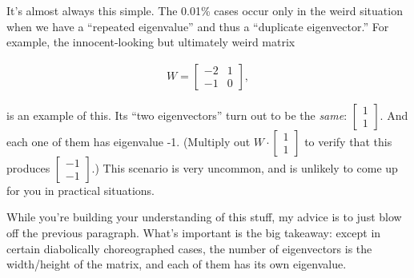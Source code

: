 
%

It's almost always this simple. The 0.01\% cases occur only in the weird
situation when we have a ``repeated eigenvalue'' and thus a ``duplicate
eigenvector.'' For example, the innocent-looking but ultimately weird matrix

\label{repeatedEigenvalue}
\vspace{-.15in}
\begin{align*}
W = \begin{bmatrix} -2 & 1 \\ -1 & 0 \end{bmatrix},
\end{align*}
\vspace{-.15in}

is an example of this. Its ``two eigenvectors'' turn out to be the
\textit{same}: {\scriptsize $\begin{bmatrix} 1 \\ 1 \end{bmatrix}$}. And each
one of them has eigenvalue -1. (Multiply out {\scriptsize $W\cdot
\begin{bmatrix} 1 \\ 1 \end{bmatrix}$} to verify that this produces
{\scriptsize $\begin{bmatrix} -1 \\ -1 \end{bmatrix}$}.) This scenario is 
very uncommon, and is unlikely to come up for you in practical situations.


\medskip

While you're building your understanding of this stuff, my advice is to just
blow off the previous paragraph. What's important is the big takeaway: except
in certain diabolically choreographed cases, the number of eigenvectors is the
width/height of the matrix, and each of them has its own eigenvalue.

